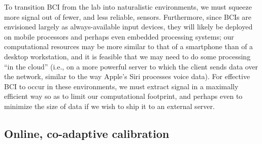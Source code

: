 To transition BCI from the lab into naturalistic environments, we must squeeze more signal out of fewer, and less reliable, sensors. Furthermore, since BCIs are envisioned largely as always-available input devices, they will likely be deployed on mobile processors and perhaps even embedded processing systems; our computational resources may be more similar to that of a smartphone than of a desktop workstation, and it is feasible that we may need to do some processing ``in the cloud'' (i.e., on a more powerful server to which the client sends data over the network, similar to the way Apple's Siri processes voice data). For effective BCI to occur in these environments, we must extract signal in a maximally efficient way so as to limit our computational footprint, and perhaps even to minimize the size of data if we wish to ship it to an external server.

\subsection{Online, co-adaptive calibration}

\noindent 



